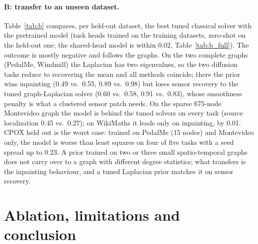 \documentclass{article}
\begin{document}
\paragraph{B: transfer to an unseen dataset.}
Table~\ref{tab:b} compares, per held-out dataset, the best tuned classical solver with the pretrained model
(task heads trained on the training datasets, zero-shot on the held-out one; the shared-head model is within
0.02, Table~\ref{tab:b_full}). The outcome is mostly negative and follows the graphs. On the two complete
graphs (PedalMe, Windmill) the Laplacian has two eigenvalues, so the two diffusion tasks reduce to recovering
the mean and all methods coincide; there the prior wins inpainting (0.49 vs.\ 0.55, 0.89 vs.\ 0.98) but loses
sensor recovery to the tuned graph-Laplacian solver (0.60 vs.\ 0.58, 0.91 vs.\ 0.83), whose smoothness penalty
is what a clustered sensor patch needs. On the sparse 675-node Montevideo graph the model is behind the tuned
solvers on every task (source localization 0.45 vs.\ 0.27); on WikiMaths it leads only on inpainting, by 0.01.
CPOX held out is the worst case: trained on PedalMe (15 nodes) and Montevideo only, the model is worse than
least squares on four of five tasks with a seed spread up to 0.23. A prior trained on two or three small
spatio-temporal graphs does not carry over to a graph with different degree statistics; what transfers is the
inpainting behaviour, and a tuned Laplacian prior matches it on sensor recovery.

\begin{table}[t]
\centering\footnotesize\setlength{\tabcolsep}{4pt}

\caption{Experiment B. Zero-shot nMSE on the held-out dataset, mean of 3 seeds: the pretrained model with task
heads, and in parentheses the best classical solver (plain, tuned Tikhonov or tuned graph-Laplacian least
squares); bold where the pretrained model is lower by at least 0.005. All rows (incl.\ the shared-head model)
and stds in Table~\ref{tab:b_full}.}
\label{tab:b}
\end{table}

\section{Ablation, limitations and conclusion}
\end{document}
